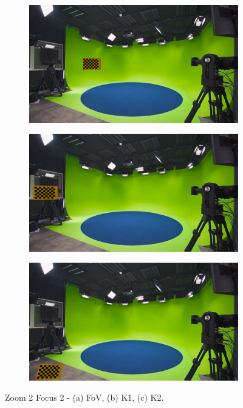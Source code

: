 \begin{figure}[h]
    \centering
    \begin{subfigure}[b]{0.45\textwidth}
        \includegraphics[width=\textwidth]{Images/08annex/results/4.2.png}
        \caption{}
        \label{fig:a2}
    \end{subfigure}
    \hfill
    \begin{subfigure}[b]{0.45\textwidth}
        \includegraphics[width=\textwidth]{Images/08annex/results/4.3.png}
        \caption{}
        \label{fig:b2}
    \end{subfigure}
    
    \vspace{0.5cm}
    
    \begin{subfigure}[b]{0.45\textwidth}
        \includegraphics[width=\textwidth]{Images/08annex/results/4.4.png}
        \caption{}
        \label{fig:c2}
    \end{subfigure}

    \caption{Zoom 2 Focus 2 - (a) FoV, (b) K1, (c) K2.}
    \label{fig:vir_fov_cal}
\end{figure}

